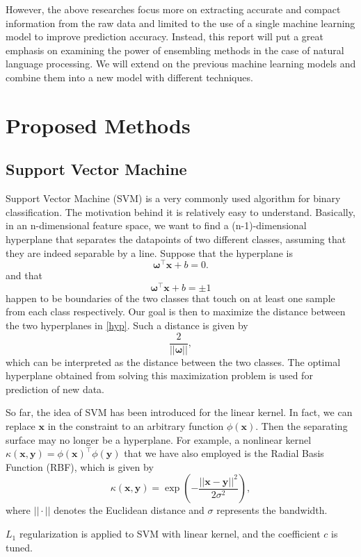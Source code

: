 \documentclass[10pt,twocolumn,letterpage]{article}
\begin{document}
However, the above researches focus more on extracting accurate and compact information from the raw data and limited to the use of a single machine learning model to improve prediction accuracy. Instead, this report will put a great emphasis on examining the power of ensembling methods in the case of natural language processing. We will extend on the previous machine learning models and combine them into a new model with different techniques.
		\section{Proposed Methods}
		\subsection{Support Vector Machine}
			Support Vector Machine (SVM) is a very commonly used algorithm for binary classification. The motivation behind it is relatively easy to understand. Basically, in an n-dimensional feature space, we want to find a (n-1)-dimensional hyperplane that separates the datapoints of two different classes, assuming that they are indeed separable by a line. Suppose that the hyperplane is $$\bm{\omega}^\top \bm{x} + b = 0.$$ and that \begin{equation}
				\bm{\omega}^\top \bm{x} + b = \pm1 \label{hyp}
			\end{equation} happen to be boundaries of the two classes that touch on at least one sample from each class respectively. Our goal is then to maximize the distance between the two hyperplanes in \ref{hyp}. Such a distance is given by $$\frac{2}{||\bm{\omega}||},$$ which can be interpreted as the distance between the two classes. The optimal hyperplane obtained from solving this maximization problem is used for prediction of new data. 
			
			So far, the idea of SVM has been introduced for the linear kernel. In fact, we can replace $\bm{x}$ in the constraint to an arbitrary function $\phi(\bm{x})$. Then the separating surface may no longer be a hyperplane. For example, a nonlinear kernel $\kappa(\bm{x},\bm{y}) = \phi(\bm{x})^\top \phi(\bm{y})$ that we have also employed is the Radial Basis Function (RBF), which is given by $$\kappa(\bm{x},\bm{y}) = \exp\left(-\frac{||\bm{x}-\bm{y}||^2}{2\sigma^2}\right),$$ where $||\cdot||$ denotes the Euclidean distance and $\sigma$ represents the bandwidth.  
			
			$L_1$ regularization is applied to SVM with linear kernel, and the coefficient $c$ is tuned. 
\end{document}

